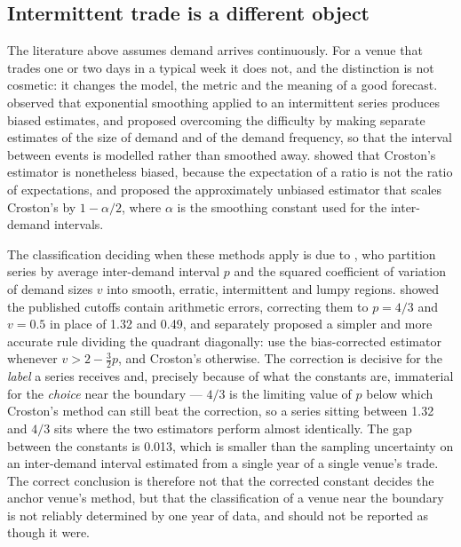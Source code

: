\subsection*{Intermittent trade is a different object}

The literature above assumes demand arrives continuously. For a venue that
trades one or two days in a typical week it does not, and the distinction is
not cosmetic: it changes the model, the metric and the meaning of a good
forecast. \citet{croston_forecasting_1972} observed that exponential smoothing
applied to an intermittent series produces biased estimates, and proposed
overcoming the difficulty by making separate estimates of the size of demand
and of the demand frequency, so that the interval between events is modelled
rather than smoothed away. \citet{syntetos_accuracy_2005} showed that
Croston's estimator is nonetheless biased, because the expectation of a ratio
is not the ratio of expectations, and proposed the approximately unbiased
estimator that scales Croston's by $1 - \alpha/2$, where $\alpha$ is the
smoothing constant used for the inter-demand intervals.

The classification deciding when these methods apply is due to
\citet{syntetos_categorization_2005}, who partition series by average
inter-demand interval $p$ and the squared coefficient of variation of demand
sizes $v$ into smooth, erratic, intermittent and lumpy regions.
\citet{kostenko_note_2006} showed the published cutoffs contain arithmetic
errors, correcting them to $p = 4/3$ and $v = 0.5$ in place of 1.32 and 0.49,
and separately proposed a simpler and more accurate rule dividing the quadrant
diagonally: use the bias-corrected estimator whenever $v > 2 - \tfrac{3}{2}p$,
and Croston's otherwise. The correction is decisive for the \emph{label} a
series receives and, precisely because of what the constants are, immaterial
for the \emph{choice} near the boundary --- $4/3$ is the limiting value of $p$
below which Croston's method can still beat the correction, so a series sitting
between 1.32 and $4/3$ sits where the two estimators perform almost
identically. The gap between the constants is 0.013, which is smaller than the
sampling uncertainty on an inter-demand interval estimated from a single year
of a single venue's trade. The correct conclusion is therefore not that the
corrected constant decides the anchor venue's method, but that the
classification of a venue near the boundary is not reliably determined by one
year of data, and should not be reported as though it were.

